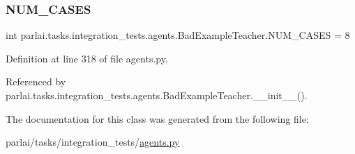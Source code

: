 \subsubsection{\texorpdfstring{N\+U\+M\+\_\+\+C\+A\+S\+ES}{NUM\_CASES}}
{\footnotesize\ttfamily int parlai.\+tasks.\+integration\+\_\+tests.\+agents.\+Bad\+Example\+Teacher.\+N\+U\+M\+\_\+\+C\+A\+S\+ES = 8\hspace{0.3cm}{\ttfamily [static]}}



Definition at line 318 of file agents.\+py.



Referenced by parlai.\+tasks.\+integration\+\_\+tests.\+agents.\+Bad\+Example\+Teacher.\+\_\+\+\_\+init\+\_\+\+\_\+().



The documentation for this class was generated from the following file\+:\begin{DoxyCompactItemize}
\item 
parlai/tasks/integration\+\_\+tests/\hyperlink{parlai_2tasks_2integration__tests_2agents_8py}{agents.\+py}\end{DoxyCompactItemize}
